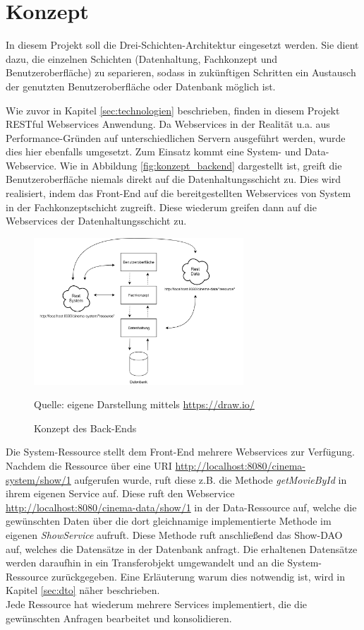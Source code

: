 \section{Konzept}
\label{sec:konzept}
\authorsection{\authorSG}
In diesem Projekt soll die Drei-Schichten-Architektur eingesetzt werden.
Sie dient dazu, die einzelnen Schichten (Datenhaltung, Fachkonzept und Benutzeroberfläche) zu separieren, sodass in zukünftigen Schritten ein Austausch der genutzten Benutzeroberfläche oder Datenbank möglich ist. 

Wie zuvor in Kapitel \vref{sec:technologien} beschrieben, finden in diesem Projekt \acs{REST}ful Webservices Anwendung.
Da Webservices in der Realität u.a. aus Performance-Gründen auf unterschiedlichen Servern ausgeführt werden, wurde dies hier ebenfalls umgesetzt.
Zum Einsatz kommt eine System- und Data-Webservice.
Wie in Abbildung \vref{fig:konzept_backend} dargestellt ist, greift die Benutzeroberfläche niemals direkt auf die Datenhaltungsschicht zu.
Dies wird realisiert, indem das Front-End auf die bereitgestellten Webservices von System in der Fachkonzeptschicht zugreift. 
Diese wiederum greifen dann auf die Webservices der Datenhaltungsschicht zu.

\begin{figure}[ht]
	\centering
	\includegraphics[width=0.7\textwidth]{img/backend/rest}
	\captionsetup{format=hang}
	\caption{Konzept des Back-Ends}
	\small Quelle: eigene Darstellung mittels \url{https://draw.io/}
	\label{fig:konzept_backend}
	\end{figure}

Die System-Ressource stellt dem Front-End mehrere Webservices zur Verfügung.
Nachdem die Ressource über eine \acs{URI} \url{http://localhost:8080/cinema-system/show/1} aufgerufen wurde, ruft diese z.B. die Methode \textit{getMovieById} in ihrem eigenen Service auf.
Diese ruft den Webservice \url{http://localhost:8080/cinema-data/show/1} in der Data-Ressource auf, welche die gewünschten Daten über die dort gleichnamige implementierte Methode im eigenen \textit{ShowService} aufruft. Diese Methode ruft anschließend das Show-\acs{DAO} auf, welches die Datensätze in der Datenbank anfragt. 
Die erhaltenen Datensätze werden daraufhin in ein Transferobjekt umgewandelt und an die System-Ressource zurückgegeben.
Eine Erläuterung warum dies notwendig ist, wird in Kapitel \vref{sec:dto} näher beschrieben. \\
Jede Ressource hat wiederum mehrere Services implementiert, die die gewünschten Anfragen bearbeitet und konsolidieren.

